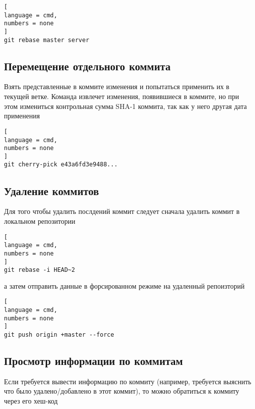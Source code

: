 \documentclass[%
	11pt,
	a4paper,
	utf8,
		]{article}
\begin{document}
\begin{lstlisting}[
language = cmd,
numbers = none
]
git rebase master server
\end{lstlisting}


\subsection{Перемещение отдельного коммита}

Взять представленные в коммите изменения и попытаться применить их в текущей ветке. Команда извлечет изменения, появившиеся в коммите, но при этом измениться контрольная сумма SHA-1 коммита, так как у него другая дата применения

\begin{lstlisting}[
language = cmd,
numbers = none
]
git cherry-pick e43a6fd3e9488...
\end{lstlisting}


\subsection{Удаление коммитов}

Для того чтобы удалить послдений коммит следует сначала удалить коммит в локальном репозитории

\begin{lstlisting}[
language = cmd,
numbers = none
]
git rebase -i HEAD~2
\end{lstlisting}
а затем отправить данные в форсированном режиме на удаленный репоизторий

\begin{lstlisting}[
language = cmd,
numbers = none
]
git push origin +master --force
\end{lstlisting}




\subsection{Просмотр информации по коммитам}

Если требуется вывести информацию по коммиту (например, требуется выяснить что было удалено/добавлено в этот коммит), то можно обратиться к коммиту через его хеш-код
\end{document}

